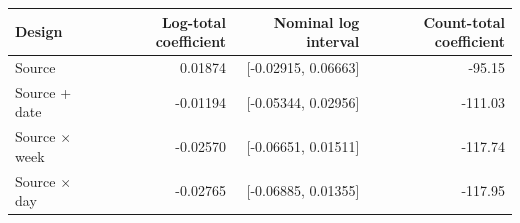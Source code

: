 \begin{tabular}{lrrr}
\toprule
Design & Log-total coefficient & Nominal log interval & Count-total coefficient \\
\midrule
Source & 0.01874 & [-0.02915, 0.06663] & -95.15 \\
Source + date & -0.01194 & [-0.05344, 0.02956] & -111.03 \\
Source $\times$ week & -0.02570 & [-0.06651, 0.01511] & -117.74 \\
Source $\times$ day & -0.02765 & [-0.06885, 0.01355] & -117.95 \\
\bottomrule
\end{tabular}
